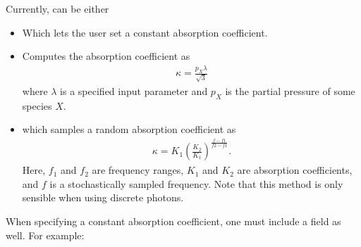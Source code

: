 \documentclass[letterpaper,10pt,english]{sphinxmanual}
\begin{document}
Currently,  can be either
\begin{itemize}
\item {} 
 Which lets the user set a constant absorption coefficient.

\item {} 
 Computes the absorption coefficient as
\begin{equation*}
\begin{split}\kappa = \frac{p_X\lambda}{\sqrt{3}}\end{split}
\end{equation*}
where \(\lambda\) is a specified input parameter and \(p_X\) is the partial pressure of some species \(X\).

\item {} 
 which samples a random absorption coefficient as
\begin{equation*}
\begin{split}\kappa = K_1 \left(\frac{K_2}{K_1}\right)^{\frac{f-f1}{f2-f1}}.\end{split}
\end{equation*}
Here, \(f_1\) and \(f_2\) are frequency ranges, \(K_1\) and \(K_2\) are absorption coefficients, and \(f\) is a stochastically sampled frequency.
Note that this method is only sensible when using discrete photons.

\end{itemize}


When specifying a constant absorption coefficient, one must include a field  as well.
For example:

\begin{sphinxVerbatim}[commandchars=\\\{\},formatcom=\scriptsize]
   \PYG{p}{[}
        
        
        
   \PYG{p}{]}
\end{sphinxVerbatim}

\end{document}
